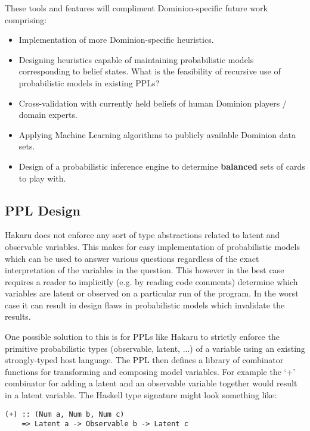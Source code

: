 These tools and features will compliment Dominion-specific future
work comprising:

\begin{itemize}
\item Implementation of more Dominion-specific heuristics.
\item Designing heuristics capable of maintaining probabilistic models
      corresponding to belief states. What is the feasibility of recursive
      use of probabilistic models in existing PPLs?
\item Cross-validation with currently held beliefs of human Dominion
      players / domain experts. \cite{human-card-comparisons}
\item Applying Machine Learning algorithms to publicly available Dominion
      data sets. \cite{dominion-data-sets}
\item Design of a probabilistic inference engine to determine
      {\bf balanced} sets of cards to play with.
\end{itemize}

\subsection{PPL Design} \label{sec:future:PPL}

Hakaru does not enforce any sort of type abstractions related to latent
and observable variables. This makes for easy implementation of probabilistic
models which can be used to answer various questions regardless of the
exact interpretation of the variables in the question. This however in the
best case requires a reader to implicitly (e.g. by reading code comments)
determine which variables are latent or observed on a particular run of
the program. In the worst case it can result in design flaws in probabilistic
models which invalidate the results.

One possible solution to this is for PPLs like Hakaru
to strictly enforce the primitive probabilistic types (observable,
latent, ...) of a variable using an existing strongly-typed host language.
The PPL then defines a library of combinator functions for transforming
and composing model variables. For example the `+' combinator for adding
a latent and an observable variable together would result in a latent
variable. The Haskell type signature might look something like:

\begin{verbatim}
(+) :: (Num a, Num b, Num c)
    => Latent a -> Observable b -> Latent c
\end{verbatim}


